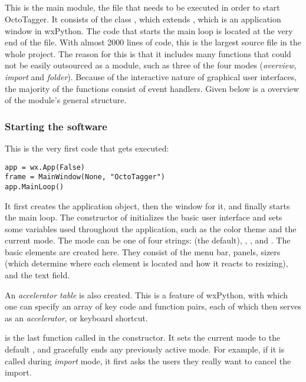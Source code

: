 \subsection{}
\def\kapitelautor{Erik Ritschl}

This is the main module, the file that needs to be executed in order to start OctoTagger. It consists of the class , which extends
, which is an application window in wxPython.
The code that starts the main loop is located at the very end of the file. %
With almost 2000 lines of code, this is the largest source file in the whole
project. The reason for this is that it includes many functions that could not
be easily outsourced as a module, such as three of the four modes (\emph{overview}, \emph{import} and \emph{folder}). Because of the interactive nature of graphical user interfaces, the majority of the  functions consist of event handlers. Given below is a overview of the
module's general structure.

\subsubsection{Starting the software}

This is the very first code that gets executed:

\begin{verbatim}
app = wx.App(False)
frame = MainWindow(None, "OctoTagger")
app.MainLoop()
\end{verbatim}

It first creates the application object, then the window for it, and finally starts the main loop. The constructor of  initializes the basic user interface and sets some variables
used throughout the application, such as the color theme and the current mode.
The mode can be one of four strings:  (the default),
, , and . The basic elements are created here. They consist of the menu bar, panels,
sizers (which determine where each element is located and how it reacts to
resizing), and the text field. %

An \emph{accelerator table} is also created. This is a feature
of wxPython, with which one can specify an array of key code
and function pairs, each of which then serves as an \emph{accelerator}, or
keyboard shortcut.

 is the last function called in the constructor. It sets the current mode
to the default , and gracefully ends any previously active
mode. For example, if it is called during \emph{import} mode, it first asks the users they really want to cancel the import.


